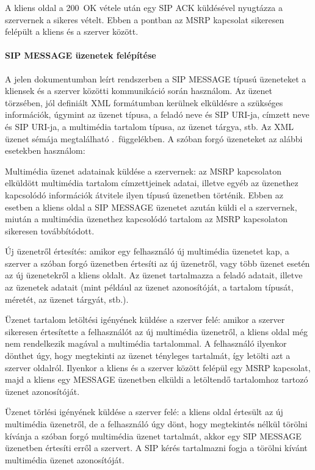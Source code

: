 A kliens oldal a 200~OK vétele után egy SIP ACK küldésével nyugtázza a szervernek a sikeres vételt. Ebben a pontban az MSRP kapcsolat sikeresen felépült a kliens és a szerver között.

\paragraph{SIP MESSAGE üzenetek felépítése\\}
\label{sec:sip_message}

A jelen dokumentumban leírt rendszerben a SIP MESSAGE típusú üzeneteket a kliensek és a szerver közötti kommunikáció során használom. Az üzenet törzsében, jól definiált XML formátumban kerülnek elküldésre a szükséges információk, úgymint az üzenet típusa, a feladó neve és SIP URI-ja, címzett neve és SIP URI-ja, a multimédia tartalom típusa, az üzenet tárgya, stb. Az XML üzenet sémája megtalálható .~függelékben. A szóban forgó üzeneteket az alábbi esetekben használom:
\begin{mydescription}
\item[Multimédia üzenet adatainak küldése a szervernek:] az MSRP kapcsolaton elküldött multimédia tartalom címzettjeinek adatai, illetve egyéb az üzenethez kapcsolódó információk átvitele ilyen típusú üzenetben történik. Ebben az esetben a kliens oldal a SIP MESSAGE üzenetet azután küldi el a szervernek, miután a multimédia üzenethez kapcsolódó tartalom az MSRP kapcsolaton sikeresen továbbítódott.
\item[Új üzenetről értesítés:] amikor egy felhasználó új multimédia üzenetet kap, a szerver a szóban forgó üzenetben értesíti az új üzenetről, vagy több üzenet esetén az új üzenetekről a kliens oldalt. Az üzenet tartalmazza a feladó adatait, illetve az üzenetek adatait (mint például az üzenet azonosítóját, a tartalom típusát, méretét, az üzenet tárgyát, stb.).
\item[Üzenet tartalom letöltési igényének küldése a szerver felé:] amikor a szerver sikeresen értesítette a felhasználót az új multimédia üzenetről, a kliens oldal még nem rendelkezik magával a multimédia tartalommal. A felhasználó ilyenkor dönthet úgy, hogy megtekinti az üzenet tényleges tartalmát, így letölti azt a szerver oldalról. Ilyenkor a kliens és a szerver között felépül egy MSRP kapcsolat, majd a kliens egy MESSAGE üzenetben elküldi a letöltendő tartalomhoz tartozó üzenet azonosítóját.
\item[Üzenet törlési igényének küldése a szerver felé:] a kliens oldal értesült az új multimédia üzenetről, de a felhasználó úgy dönt, hogy megtekintés nélkül törölni kívánja a szóban forgó multimédia üzenet tartalmát, akkor egy SIP MESSAGE üzenetben értesíti erről a szervert. A SIP kérés  tartalmazni fogja a törölni kívánt multimédia üzenet azonosítóját.

\end{mydescription}

